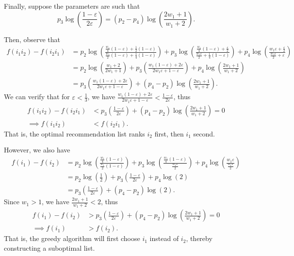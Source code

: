 Finally, suppose the parameters are such that $$p_3 \log\left(\frac{1-\varepsilon}{2\varepsilon} \right) = (p_2-p_4) \log \left(\frac{2w_1 + 1}{w_1+2} \right).$$

Then, observe that 
\begin{align*}
    f(i_1 i_2) - f(i_2 i_1) &= p_2 \log \left( \frac{\frac{w_1}{4}(1-\varepsilon) + \frac{1}{2}(1-\varepsilon)}{\frac{w_1}{2}(1-\varepsilon) + \frac{1}{4}(1-\varepsilon)} \right) + p_3 \log\left( \frac{\frac{w_1}{4}(1-\varepsilon) + \frac{\varepsilon}{2}}{\frac{w_1\varepsilon}{2} + \frac{1}{4}(1-\varepsilon)} \right) + p_4 \log \left(\frac{w_1\varepsilon + \frac{\varepsilon}{2}}{\frac{w_1\varepsilon}{2} + \varepsilon} \right) \\
    &= p_2 \log\left(\frac{w_1 + 2}{2w_1 + 1} \right) + p_3 \left( \frac{w_1(1-\varepsilon) + 2\varepsilon}{2w_1\varepsilon + 1-\varepsilon} \right) + p_4 \log \left( \frac{2w_1 + 1}{w_1 + 2} \right) \\
    &= p_3 \left( \frac{w_1(1-\varepsilon) + 2\varepsilon}{2w_1\varepsilon + 1-\varepsilon} \right) + (p_4-p_2) \log \left( \frac{2w_1 + 1}{w_1 + 2} \right).
\end{align*}
We can verify that for $\varepsilon < \frac{1}{3}$, we have $\frac{w_1(1-\varepsilon) + 2\varepsilon}{2w_1\varepsilon + 1-\varepsilon} < \frac{1-\varepsilon}{2\varepsilon}$, thus 
\begin{align*}
    f(i_1 i_2) - f(i_2 i_1) &< p_3 \left( \frac{1-\varepsilon}{2\varepsilon}\right) + (p_4-p_2) \log \left( \frac{2w_1 + 1}{w_1 + 2} \right) = 0\\
    \implies f(i_1 i_2) &< f(i_2 i_1).
\end{align*}
That is, the optimal recommendation list ranks $i_2$ first, then $i_1$ second.

However, we also have
\begin{align*}
    f(i_1) - f(i_2) &= p_2 \log \left( \frac{\frac{w_1}{4}(1-\varepsilon)}{\frac{w_1}{2}(1-\varepsilon) } \right) + p_3 \log\left( \frac{\frac{w_1}{4}(1-\varepsilon)}{\frac{w_1\varepsilon}{2}} \right) + p_4 \log \left(\frac{w_1\varepsilon}{\frac{w_1\varepsilon}{2}} \right) \\
    &= p_2 \log\left(\frac{1}{2} \right) + p_3 \left( \frac{1-\varepsilon}{2\varepsilon} \right) + p_4 \log \left(2\right) \\
    &= p_3 \left( \frac{1-\varepsilon}{2\varepsilon} \right) + (p_4-p_2) \log \left(2 \right).
\end{align*}
Since $w_1 > 1$, we have $\frac{2w_1 + 1}{w_1+2} < 2$, thus
\begin{align*}
    f(i_1) - f(i_2) &> p_3 \left( \frac{1-\varepsilon}{2\varepsilon}\right) + (p_4-p_2) \log \left( \frac{2w_1 + 1}{w_1 + 2} \right) = 0\\
    \implies f(i_1) &> f(i_2).
\end{align*}
That is, the greedy algorithm will first choose $i_1$ instead of $i_2$, thereby constructing a suboptimal list.

